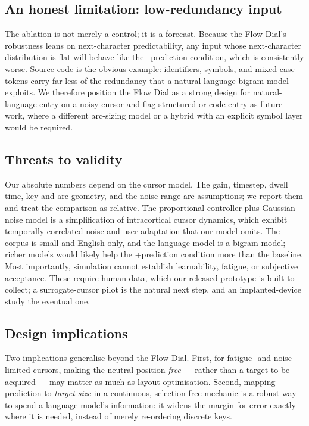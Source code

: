 \documentclass[manuscript,review,anonymous]{acmart}
\begin{document}
\subsection{An honest limitation: low-redundancy input}
The ablation is not merely a control; it is a forecast. Because the Flow Dial's
robustness leans on next-character predictability, any input whose
next-character distribution is flat will behave like the --prediction condition,
which is consistently worse. Source code is the obvious example: identifiers,
symbols, and mixed-case tokens carry far less of the redundancy that a
natural-language bigram model exploits. We therefore position the Flow Dial as a
strong design for natural-language entry on a noisy cursor and flag structured or
code entry as future work, where a different arc-sizing model or a hybrid with an
explicit symbol layer would be required.

\subsection{Threats to validity}
Our absolute numbers depend on the cursor model. The gain, timestep, dwell time,
key and arc geometry, and the noise range are assumptions; we report them and
treat the comparison as relative. The proportional-controller-plus-Gaussian-noise
model is a simplification of intracortical cursor dynamics, which exhibit
temporally correlated noise and user adaptation that our model omits. The corpus
is small and English-only, and the language model is a bigram model; richer
models would likely help the +prediction condition more than the baseline. Most
importantly, simulation cannot establish learnability, fatigue, or subjective
acceptance. These require human data, which our released prototype is built to
collect; a surrogate-cursor pilot is the natural next step, and an
implanted-device study the eventual one.

\subsection{Design implications}
Two implications generalise beyond the Flow Dial. First, for fatigue- and
noise-limited cursors, making the neutral position \emph{free} --- rather than a
target to be acquired --- may matter as much as layout optimisation. Second,
mapping prediction to \emph{target size} in a continuous, selection-free mechanic
is a robust way to spend a language model's information: it widens the margin for
error exactly where it is needed, instead of merely re-ordering discrete keys.
\end{document}
